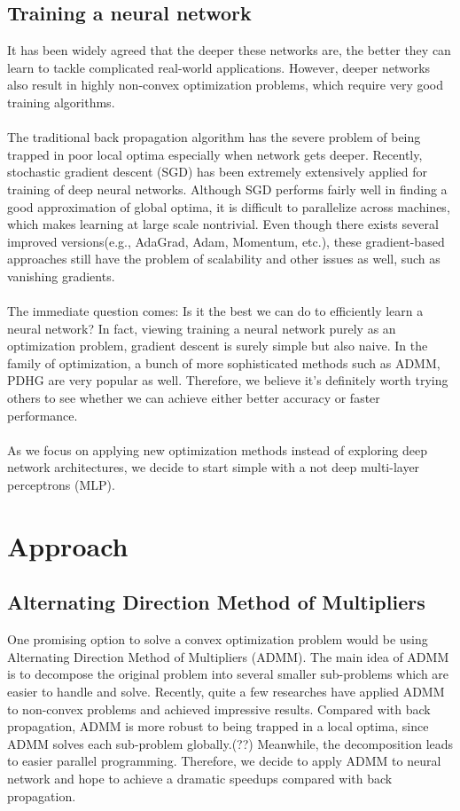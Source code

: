 \documentclass[11pt]{report}
\begin{document}
\subsection*{Training a neural network}
It has been widely agreed that the deeper these networks are, the better they can learn to tackle complicated real-world applications. However, deeper networks also result in highly non-convex optimization problems, which require very good training algorithms. \\
\\
The traditional back propagation algorithm has the severe problem of being trapped in poor local optima especially when network gets deeper. Recently, stochastic gradient descent (SGD) has been extremely extensively applied for training of deep neural networks. Although SGD performs fairly well in finding a good approximation of global optima, it is difficult to parallelize across machines, which makes learning at large scale nontrivial.  Even though there exists several improved versions(e.g., AdaGrad, Adam, Momentum, etc.), these gradient-based approaches still have the problem of scalability and other issues as well, such as vanishing gradients.\\
\\
The immediate question comes: Is it the best we can do to efficiently learn a neural network?  In fact, viewing training a neural network purely as an optimization problem, gradient descent is surely simple but also naive.  In the family of optimization, a bunch of more sophisticated methods such as ADMM, PDHG are very popular as well. Therefore, we believe it's definitely worth trying others to see whether we can achieve either better accuracy or faster performance.
\\\\
As we focus on applying new optimization methods instead of exploring deep network architectures, we decide to start simple with a not deep multi-layer perceptrons (MLP).

\section*{Approach}
\subsection*{Alternating Direction Method of Multipliers}
One promising option to solve a convex optimization problem  would be using Alternating Direction Method of Multipliers (ADMM). The main idea of ADMM is to decompose the original problem into several smaller sub-problems which are easier to handle and solve. Recently, quite a few researches have applied ADMM to non-convex problems and achieved impressive results. Compared with back propagation, ADMM is more robust to being trapped in a local optima, since ADMM solves each sub-problem globally.(??) Meanwhile, the decomposition leads to easier parallel programming. Therefore, we decide to apply ADMM to neural network and hope to achieve a dramatic speedups compared with back propagation.
\end{document}
